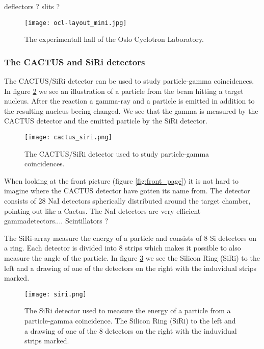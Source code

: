 \documentclass[11pt,a4wide]{article}
\begin{document}
deflectors ? slits ?
\begin{figure}[htp]
\centering
\texttt{[image: ocl-layout\_mini.jpg]}
\caption{The experimentall hall of the Oslo Cyclotron Laboratory.}
\label{fig:OLC_exp_hall}
\end{figure}

\subsubsection{The CACTUS and SiRi detectors}
The CACTUS/SiRi detector can be used to study particle-gamma coincidences. In figure \ref{fig: cactus_siri} we see an illustration of a particle from the beam hitting a target nucleus. After the reaction a gamma-ray and a particle is emitted in addition to the resulting nucleus beeing changed. We see that the gamma is measured by the CACTUS detector and the emitted particle by the SiRi detector. 
\begin{figure}[htp]
\centering
\texttt{[image: cactus\_siri.png]}
\caption{The CACTUS/SiRi detector used to study particle-gamma coincidences.}
\label{fig: cactus_siri}
\end{figure}

When looking at the front picture (figure \ref{fig:front_page}) it is not hard to imagine where the CACTUS detector have gotten its name from. The detector consists of 28 NaI detectors spherically distributed around the target chamber, pointing out like a Cactus. The NaI detectors are very efficient gammadetectors....
Scintillators ?

The SiRi-array measure the energy of a particle and consists of 8 Si detectors on a ring. Each detector is divided into 8 strips which makes it possible to also measure the angle of the particle. In figure \ref{fig: siri} we see the Silicon Ring (SiRi) to the left and a drawing of one of the detectors on the right with the induvidual strips marked.
\begin{figure}[htp]
\centering
\texttt{[image: siri.png]}
\caption{The SiRi detector used to measure the energy of a particle from a particle-gamma coincidence. The Silicon Ring (SiRi) to the left and a drawing of one of the 8 detectors on the right with the induvidual strips marked.}
\label{fig: siri}
\end{figure}

\end{document}
